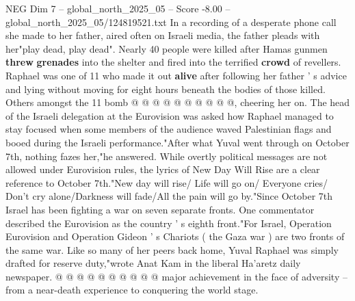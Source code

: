 \begin{textsample}{NEG Dim 7 – global\_north\_2025\_05 – Score -8.00 – global\_north\_2025\_05/124819521.txt}
In a recording of a desperate phone call she made to her father, aired often on Israeli media, the father pleads with her"play dead, play dead".
Nearly 40 people were killed after Hamas gunmen \textbf{threw} \textbf{grenades} into the shelter and fired into the terrified \textbf{crowd} of revellers.
Raphael was one of 11 who made it out \textbf{alive} after following her father ' s advice and lying without moving for eight hours beneath the bodies of those killed.
Others amongst the 11 bomb @ @ @ @ @ @ @ @ @ @, cheering her on.
The head of the Israeli delegation at the Eurovision was asked how Raphael managed to stay focused when some members of the audience waved Palestinian flags and booed during the Israeli performance."After what Yuval went through on October 7th, nothing fazes her,"he answered.
While overtly political messages are not allowed under Eurovision rules, the lyrics of New Day Will Rise are a clear reference to October 7th."New day will rise/ Life will go on/ Everyone cries/ Don't cry alone/Darkness will fade/All the pain will go by."Since October 7th Israel has been fighting a war on seven separate fronts.
One commentator described the Eurovision as the country ' s eighth front."For Israel, Operation Eurovision and Operation Gideon ' s Chariots ( the Gaza war ) are two fronts of the same war.
Like so many of her peers back home, Yuval Raphael was simply drafted for reserve duty,"wrote Anat Kam in the liberal Ha'aretz daily newspaper. @ @ @ @ @ @ @ @ @ @ major achievement in the face of adversity -- from a near-death experience to conquering the world stage.

\end{textsample}
